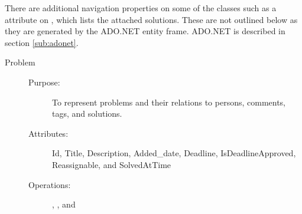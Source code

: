 There are additional navigation properties on some of the classes such as a  attribute on , which lists the attached solutions. These are not outlined below as they are generated by the ADO.NET entity frame. ADO.NET is described in section \ref{sub:adonet}.
\begin{description}
\item[Problem]\hfill
\begin{description}
	\item[Purpose:]To represent problems and their relations to persons, comments, tags, and solutions.
	\item[Attributes:]Id, Title, Description, Added\_date, Deadline, IsDeadlineApproved, Reassignable, and SolvedAtTime
	\item[Operations:], , and 
\end{description}
\end{description}

